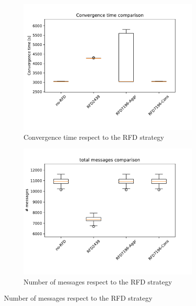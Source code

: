 \begin{figure}[h]
     \centering
     \begin{subfigure}[b]{0.325\textwidth}
         \centering
         \includegraphics[width=\textwidth]{images/RFD/miceVSelephants/mice/cisco_1000MRAI30_rfd_comparison_time_boxplot.pdf}
         \caption{Convergence time respect to the RFD strategy}
         \label{fig:1000_RFD_MRAI30_mice_time}
     \end{subfigure}
     \hfill
     \begin{subfigure}[b]{0.325\textwidth}
         \centering
         \includegraphics[width=\textwidth]{images/RFD/miceVSelephants/mice/cisco_1000MRAI30_rfd_comparison_messages_boxplot.pdf}
         \caption{Number of messages respect to the RFD strategy}

\end{subfigure}
\end{figure}
